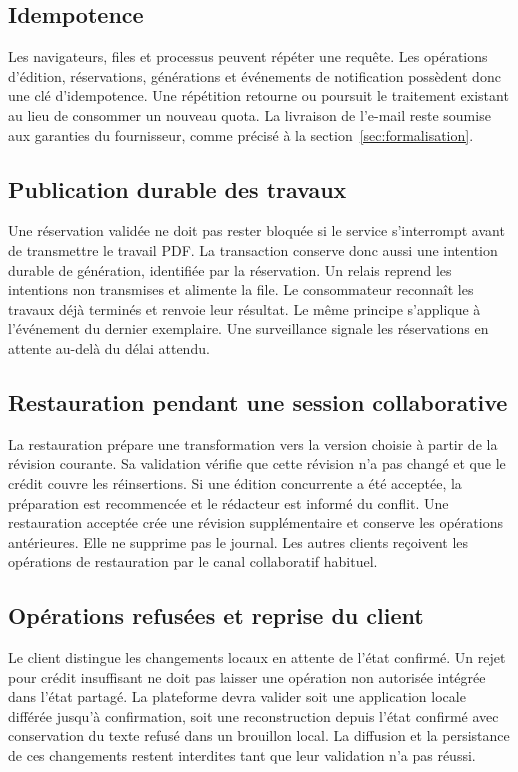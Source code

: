 \subsection{Idempotence}

Les navigateurs, files et processus peuvent répéter une requête. Les opérations d'édition, réservations, générations et événements de notification possèdent donc une clé d'idempotence. Une répétition retourne ou poursuit le traitement existant au lieu de consommer un nouveau quota. La livraison de l'e-mail reste soumise aux garanties du fournisseur, comme précisé à la section~\ref{sec:formalisation}.

\subsection{Publication durable des travaux}
Une réservation validée ne doit pas rester bloquée si le service s'interrompt avant de transmettre le travail PDF. La transaction conserve donc aussi une intention durable de génération, identifiée par la réservation. Un relais reprend les intentions non transmises et alimente la file. Le consommateur reconnaît les travaux déjà terminés et renvoie leur résultat. Le même principe s'applique à l'événement du dernier exemplaire. Une surveillance signale les réservations en attente au-delà du délai attendu.

\subsection{Restauration pendant une session collaborative}
La restauration prépare une transformation vers la version choisie à partir de la révision courante. Sa validation vérifie que cette révision n'a pas changé et que le crédit couvre les réinsertions. Si une édition concurrente a été acceptée, la préparation est recommencée et le rédacteur est informé du conflit. Une restauration acceptée crée une révision supplémentaire et conserve les opérations antérieures. Elle ne supprime pas le journal. Les autres clients reçoivent les opérations de restauration par le canal collaboratif habituel.

\subsection{Opérations refusées et reprise du client}
Le client distingue les changements locaux en attente de l'état confirmé. Un rejet pour crédit insuffisant ne doit pas laisser une opération non autorisée intégrée dans l'état partagé. La plateforme devra valider soit une application locale différée jusqu'à confirmation, soit une reconstruction depuis l'état confirmé avec conservation du texte refusé dans un brouillon local. La diffusion et la persistance de ces changements restent interdites tant que leur validation n'a pas réussi.


